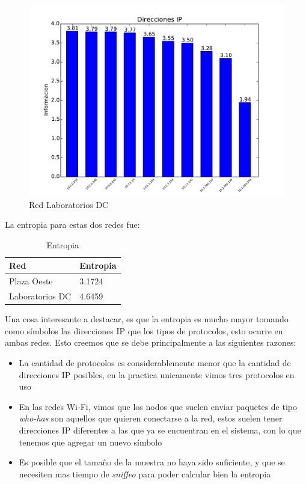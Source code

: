 \begin{figure}[ht]
\begin{center}
\includegraphics[width=0.6\columnwidth]{graficos/dc_top_inf_s2.pdf}
\caption{Red Laboratorios DC}
\end{center}
\end{figure}

\pagebreak

La entropia para estas dos redes fue:

\begin{table}[ht]
\centering
\caption{Entropia}
\label{my-label}
\begin{tabular}{ll}
\hline
Red         & Entropia \\ \hline
Plaza Oeste & 3.1724   \\
Laboratorios DC    & 4.6459   \\ \hline
\end{tabular}
\end{table}

Una cosa interesante a destacar, es que la entropia es mucho mayor tomando como símbolos las direcciones IP que los tipos de protocolos, esto ocurre en ambas redes. Esto creemos que se debe principalmente a las siguientes razones:

\begin{itemize}
	\item La cantidad de protocolos es considerablemente menor que la cantidad de direcciones IP posibles, en la practica unicamente vimos tres protocolos en uso
	\item En las redes Wi-Fi, vimos que los nodos que suelen enviar paquetes de tipo \textit{who-has} son aquellos que quieren conectarse a la red, estos suelen tener direcciones IP diferentes a las que ya se encuentran en el sistema, con lo que tenemos que agregar un nuevo símbolo
	\item Es posible que el tamaño de la muestra no haya sido suficiente, y que se necesiten mas tiempo de \textit{sniffeo} para poder calcular bien la entropia
\end{itemize}

